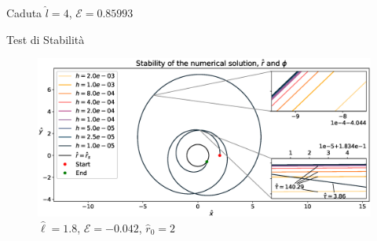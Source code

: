 \begin{frame}{Caduta $\hat l = 4$, $\mathcal E = 0.85993$}
    \centering
\end{frame}


\begin{frame}{Test di Stabilità}
    \begin{figure}
        \centering
        \includegraphics[trim={0 0 0 37},clip, width=\textwidth]{Figures/ch2/stability_infall2.eps}
        \caption{ $\hat \ell = 1.8$, $\mathcal E = -0.042$, $\hat r_0 = 2$}
    \end{figure}
\end{frame}


%
%


